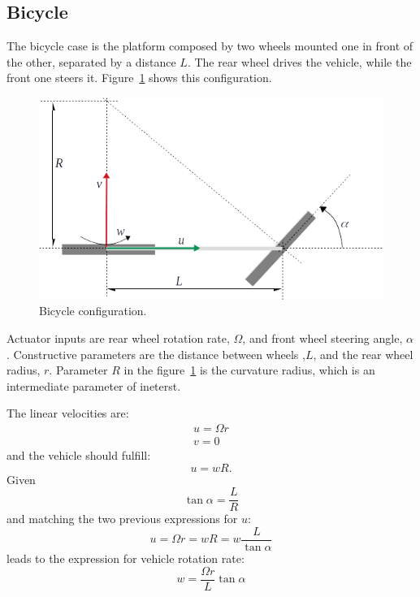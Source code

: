 \subsection{Bicycle}
\label{subsec:bicycle}
The bicycle case is the platform composed by two wheels mounted one in front of the other, separated by a distance $L$. The rear wheel drives the vehicle, while the front one steers it. Figure~\ref{fig:bike_kinematics} shows this configuration.
\begin{figure}[bth!]
  \begin{center}
    \includegraphics[width=1.0\columnwidth]{figures/bike_kinematics.png}
    \caption{Bicycle configuration.}
    \label{fig:bike_kinematics}
  \end{center}
\end{figure}
Actuator inputs are rear wheel rotation rate, $\Omega$, and front wheel steering angle, $\alpha$. Constructive parameters are the distance between wheels ,$L$, and the rear wheel radius, $r$. Parameter $R$ in the figure~\ref{fig:bike_kinematics} is the curvature radius, which is an intermediate parameter of ineterst.

The linear velocities are: 
\begin{align}
\label{eq:bike_fwd_kinematics_1}
u = \Omega r \\
v = 0
\end{align} 
and the vehicle should fulfill:
\begin{equation}
 u = wR.
\end{equation}
Given 
\begin{equation}
 \tan \alpha = \frac{L}{R}
\end{equation}
and matching the two previous expressions for $u$:
\begin{equation}
 u = \Omega r = wR = w\frac{L}{\tan \alpha} 
\end{equation}
leads to the expression for vehicle rotation rate: 
\begin{equation}
\label{eq:bike_fwd_kinematics_2}
w=\frac{\Omega r}{L} \tan \alpha 
\end{equation}

